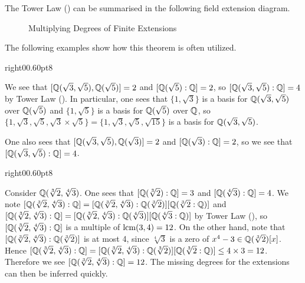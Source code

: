 The Tower Law () can be summarised in the following field extension diagram.

\begin{figure}[H]
    \centering
    \caption{Multiplying Degrees of Finite Extensions}
\end{figure}

The following examples show how this theorem is often utilized.

\begin{examplewithcutout}{right}{0}{0.6\textwidth}{0pt}{8}{
    \begin{figure}[H]
        \centering
    \end{figure}
}\label{example-Q-sqrt3-sqrt5}
    We see that $[\mathbb{Q}(\sqrt3, \sqrt5), \mathbb{Q}(\sqrt5)] = 2$ and $[\mathbb{Q}(\sqrt5):\mathbb{Q}] = 2$, so $[\mathbb{Q}(\sqrt3, \sqrt5):\mathbb{Q}] = 4$ by Tower Law (). In particular, one sees that $\{1, \sqrt3\}$ is a basis for $\mathbb{Q}(\sqrt3,\sqrt5)$ over $\mathbb{Q}(\sqrt5)$ and $\{1, \sqrt5\}$ is a basis for $\mathbb{Q}(\sqrt5)$ over $\mathbb{Q}$, so $\{1, \sqrt3, \sqrt5, \sqrt3\times\sqrt5\} = \{1, \sqrt3, \sqrt5, \sqrt{15}\}$ is a basis for $\mathbb{Q}(\sqrt3, \sqrt5)$.

    One also sees that $[\mathbb{Q}(\sqrt3, \sqrt5), \mathbb{Q}(\sqrt3)] = 2$ and $[\mathbb{Q}(\sqrt3):\mathbb{Q}] = 2$, so we see that $[\mathbb{Q}(\sqrt3, \sqrt5):\mathbb{Q}] = 4$.
\end{examplewithcutout}

\begin{examplewithcutout}{right}{0}{0.6\textwidth}{0pt}{8}{
    \begin{figure}[H]
        \centering
    \end{figure}
}
    Consider $\mathbb{Q}(\sqrt[3]2, \sqrt[4]3)$. One sees that $[\mathbb{Q}(\sqrt[3]2):\mathbb{Q}] = 3$ and $[\mathbb{Q}(\sqrt[4]3):\mathbb{Q}] = 4$. We note $[\mathbb{Q}(\sqrt[3]2, \sqrt[4]3):\mathbb{Q}] = [\mathbb{Q}(\sqrt[3]2, \sqrt[4]3):\mathbb{Q}(\sqrt[3]2)][\mathbb{Q}(\sqrt[3]2:\mathbb{Q})]$ and $[\mathbb{Q}(\sqrt[3]2, \sqrt[4]3):\mathbb{Q}] = [\mathbb{Q}(\sqrt[3]2, \sqrt[4]3):\mathbb{Q}(\sqrt[4]3)][\mathbb{Q}(\sqrt[4]3:\mathbb{Q})]$ by Tower Law (), so $[\mathbb{Q}(\sqrt[3]2, \sqrt[4]3):\mathbb{Q}]$ is a multiple of $\mathrm{lcm}(3, 4) = 12$. On the other hand, note that $[\mathbb{Q}(\sqrt[3]2, \sqrt[4]3):\mathbb{Q}(\sqrt[3]2)]$ is at most 4, since $\sqrt[4]3$ is a zero of $x^4 - 3 \in \mathbb{Q}(\sqrt[3]2)[x]$. Hence $[\mathbb{Q}(\sqrt[3]2, \sqrt[4]3):\mathbb{Q}] = [\mathbb{Q}(\sqrt[3]2, \sqrt[4]3):\mathbb{Q}(\sqrt[3]2)][\mathbb{Q}(\sqrt[3]2:\mathbb{Q})] \leq 4 \times 3 = 12$. Therefore we see $[\mathbb{Q}(\sqrt[3]2, \sqrt[4]3):\mathbb{Q}] = 12$. The missing degrees for the extensions can then be inferred quickly.
\end{examplewithcutout}

